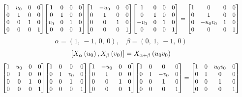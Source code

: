 \documentclass[11pt]{article}
\theoremstyle{definition}
\begin{document}
\[
\scaletoalign{\textwidth}{{\left[\begin{matrix}1 & u_{0} & 0 & 0\\0 & 1 & 0 & 0\\0 & 0 & 1 & 0\\0 & 0 & 0 & 1\end{matrix}\right]} {\left[\begin{matrix}1 & 0 & 0 & 0\\0 & 1 & 0 & 0\\v_{0} & 0 & 1 & 0\\0 & 0 & 0 & 1\end{matrix}\right]} {\left[\begin{matrix}1 & - u_{0} & 0 & 0\\0 & 1 & 0 & 0\\0 & 0 & 1 & 0\\0 & 0 & 0 & 1\end{matrix}\right]} {\left[\begin{matrix}1 & 0 & 0 & 0\\0 & 1 & 0 & 0\\- v_{0} & 0 & 1 & 0\\0 & 0 & 0 & 1\end{matrix}\right]} = {\left[\begin{matrix}1 & 0 & 0 & 0\\0 & 1 & 0 & 0\\0 & - u_{0} v_{0} & 1 & 0\\0 & 0 & 0 & 1\end{matrix}\right]}}
\]
\[
\alpha = \left( 1, \  -1, \  0, \  0\right), \quad \beta = \left( 0, \  1, \  -1, \  0\right)
\]
\[
\scaletoalign{\textwidth}{\left[ X_{\alpha}\left(u_{0}\right), X_{\beta}\left(v_{0}\right) \right] = X_{\alpha + \beta}\left(u_{0} v_{0}\right)}
\]
\[
\scaletoalign{\textwidth}{{\left[\begin{matrix}1 & u_{0} & 0 & 0\\0 & 1 & 0 & 0\\0 & 0 & 1 & 0\\0 & 0 & 0 & 1\end{matrix}\right]} {\left[\begin{matrix}1 & 0 & 0 & 0\\0 & 1 & v_{0} & 0\\0 & 0 & 1 & 0\\0 & 0 & 0 & 1\end{matrix}\right]} {\left[\begin{matrix}1 & - u_{0} & 0 & 0\\0 & 1 & 0 & 0\\0 & 0 & 1 & 0\\0 & 0 & 0 & 1\end{matrix}\right]} {\left[\begin{matrix}1 & 0 & 0 & 0\\0 & 1 & - v_{0} & 0\\0 & 0 & 1 & 0\\0 & 0 & 0 & 1\end{matrix}\right]} = {\left[\begin{matrix}1 & 0 & u_{0} v_{0} & 0\\0 & 1 & 0 & 0\\0 & 0 & 1 & 0\\0 & 0 & 0 & 1\end{matrix}\right]}}
\]
\end{document}

